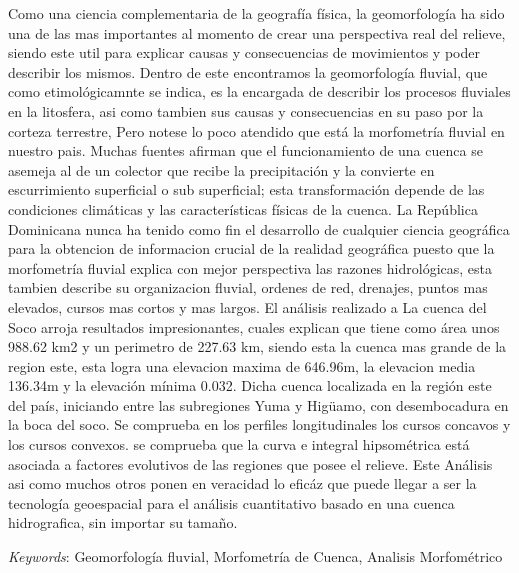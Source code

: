 \documentclass[11pt,]{article}
\renewenvironment{abstract}
 {{%
    \setlength{\leftmargin}{0mm}
    \setlength{\rightmargin}{\leftmargin}%
  }%
  \relax}
 {\endlist}
\begin{document}
\begin{abstract}

    \hbox{\vrule height .2pt width 39.14pc}

    \vskip 8.5pt %

\noindent Como una ciencia complementaria de la geografía física, la geomorfología
ha sido una de las mas importantes al momento de crear una perspectiva
real del relieve, siendo este util para explicar causas y consecuencias
de movimientos y poder describir los mismos. Dentro de este encontramos
la geomorfología fluvial, que como etimológicamnte se indica, es la
encargada de describir los procesos fluviales en la litosfera, asi como
tambien sus causas y consecuencias en su paso por la corteza terrestre,
Pero notese lo poco atendido que está la morfometría fluvial en nuestro
pais. Muchas fuentes afirman que el funcionamiento de una cuenca se
asemeja al de un colector que recibe la precipitación y la convierte en
escurrimiento superficial o sub superficial; esta transformación depende
de las condiciones climáticas y las características físicas de la
cuenca. La República Dominicana nunca ha tenido como fin el desarrollo
de cualquier ciencia geográfica para la obtencion de informacion crucial
de la realidad geográfica puesto que la morfometría fluvial explica con
mejor perspectiva las razones hidrológicas, esta tambien describe su
organizacion fluvial, ordenes de red, drenajes, puntos mas elevados,
cursos mas cortos y mas largos. El análisis realizado a La cuenca del
Soco arroja resultados impresionantes, cuales explican que tiene como
área unos 988.62 km2 y un perimetro de 227.63 km, siendo esta la cuenca
mas grande de la region este, esta logra una elevacion maxima de
646.96m, la elevacion media 136.34m y la elevación mínima 0.032. Dicha
cuenca localizada en la región este del país, iniciando entre las
subregiones Yuma y Higüamo, con desembocadura en la boca del soco. Se
comprueba en los perfiles longitudinales los cursos concavos y los
cursos convexos. se comprueba que la curva e integral hipsométrica está
asociada a factores evolutivos de las regiones que posee el relieve.
Este Análisis asi como muchos otros ponen en veracidad lo eficáz que
puede llegar a ser la tecnología geoespacial para el análisis
cuantitativo basado en una cuenca hidrografica, sin importar su tamaño.


\vskip 8.5pt \noindent \emph{Keywords}: Geomorfología fluvial, Morfometría de Cuenca, Analisis Morfométrico \par

    \hbox{\vrule height .2pt width 39.14pc}



\end{abstract}
\end{document}
